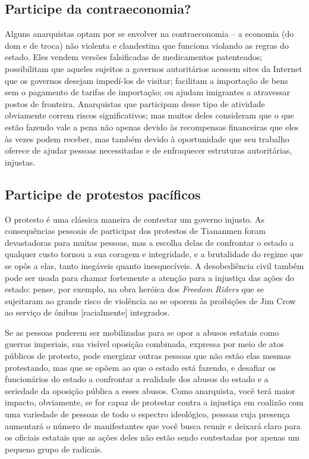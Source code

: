 \subsection*{Participe da contraeconomia?}

Alguns anarquistas optam por se envolver na contraeconomia -- a economia (do dom e de troca) não violenta e clandestina que funciona violando as regras do estado. Eles vendem versões falsificadas de medicamentos patenteados; possibilitam que aqueles sujeitos a governos autoritários acessem sites da Internet que os governos desejam impedí-los de visitar; facilitam a importação de bens sem o pagamento de tarifas de importação; ou ajudam imigrantes a atravessar postos de fronteira. Anarquistas que participam desse tipo de atividade obviamente correm riscos significativos; mas muitos deles consideram que o que estão fazendo vale a pena não apenas devido às recompensas financeiras que eles às vezes podem receber, mas também devido à oportunidade que seu trabalho oferece de ajudar pessoas necessitadas e de enfraquecer estruturas autoritárias, injustas.

\subsection*{Participe de protestos pacíficos}

O protesto é uma clássica maneira de contestar um governo injusto. As consequências pessoais de participar dos protestos de Tiananmen foram devastadoras para muitas pessoas, mas a escolha delas de confrontar o estado a qualquer custo tornou a sua coragem e integridade, e a brutalidade do regime que se opôs a elas, tanto inegáveis quanto inesquecíveis. A desobediência civil também pode ser usada para chamar fortemente a atenção para a injustiça das ações do estado: pense, por exemplo, na obra heróica dos \emph{Freedom Riders} que se sujeitaram ao grande risco de violência ao se oporem às proibições de Jim Crow ao serviço de ônibus [racialmente] integrados. 

Se as pessoas puderem ser mobilizadas para se opor a abusos estatais como guerras imperiais, sua visível oposição combinada, expressa por meio de atos públicos de protesto, pode energizar outras pessoas que não estão elas mesmas protestando, mas que se opõem ao que o estado está fazendo, e desafiar os funcionários do estado a confrontar a realidade dos abusos do estado e a seriedade da oposição pública a esses abusos. Como anarquista, você terá maior impacto, obviamente, se for capaz de protestar contra a injustiça em coalizão com uma variedade de pessoas de todo o espectro ideológico, pessoas cuja presença aumentará o número de manifestantes que você busca reunir e deixará claro para os oficiais estatais que as ações deles não estão sendo contestadas por apenas um pequeno grupo de radicais.

